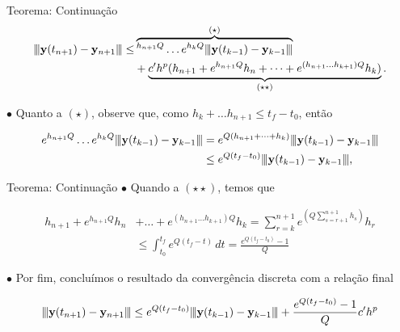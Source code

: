 \documentclass{beamer}
\newcommand{\vertiii}[1]{{\left\vert\kern-0.25ex\left\vert\kern-0.25ex\left\vert #1 
    \right\vert\kern-0.25ex\right\vert\kern-0.25ex\right\vert}}
\theoremstyle{plain}
\theoremstyle{definition}
\begin{document}

\begin{frame}{Teorema: Continuação}
    \begin{align*}
        \vertiii{\mathbf{y}(t_{n+1})-\mathbf{y}_{n+1}} \leq & \overbrace{^{h_{n+1}Q} \dots e^{h_{k}Q} \vertiii{\mathbf{y}(t_{k-1})-\mathbf{y}_{k-1}}}^{(\star)} \\
                                                            &+ \underbrace{c' h^p (h_{n+1} + e^{h_{n+1}Q}h_n + \dots + e^{(h_{n+1} \dots h_{k+1})Q}h_k)}_{(\star \star)}.
    \end{align*}

    \phantom{aa} $\bullet$ Quanto a $(\star)$, observe que, como $h_k + \dots h_{n+1} \leq t_f - t_0$, então

    \begin{align*}
      e^{h_{n+1}Q} \dots e^{h_{k}Q} \vertiii{\mathbf{y}(t_{k-1})-\mathbf{y}_{k-1}} &= e^{Q(h_{n+1} + \dots + h_k)} \vertiii{\mathbf{y}(t_{k-1})-\mathbf{y}_{k-1}} \\
                                                                                   &\leq e^{Q(t_f - t_0)} \vertiii{\mathbf{y}(t_{k-1})-\mathbf{y}_{k-1}},
    \end{align*}
\end{frame}



\begin{frame}{Teorema: Continuação}
    \noindent
    \phantom{aa} $\bullet$ Quando a $(\star \star)$, temos que

    

    \[
        \begin{split}
            h_{n+1} + e^{h_{n+1}Q}h_n &+ \dots + e^{(h_{n+1} \dots h_{k+1})Q}h_k = 
            \sum_{r = k}^{n+1}e^{\left( Q \sum_{s = r + 1}^{n+1}h_s \right)} h_r \\
            &\leq \int_{t_0}^{t_f} e^{Q(t_f - t)} \, dt = \frac{e^{Q(t_f - t_0)} - 1}{Q}
        \end{split}
    \]

    \phantom{aa} $\bullet$ Por fim, concluímos o resultado da convergência discreta com a relação final

    \[
      \vertiii{  \mathbf{y}(t_{n+1})-\mathbf{y}_{n+1} } \leq e^{Q(t_{f}-t_{0})} \vertiii{ \mathbf{y}(t_{k-1})-\mathbf{y}_{k-1} }
      +\frac{e^{Q(t_{f}-t_{0})}-1}{Q} c' h^{p}
    \]
\end{frame}
\end{document}
